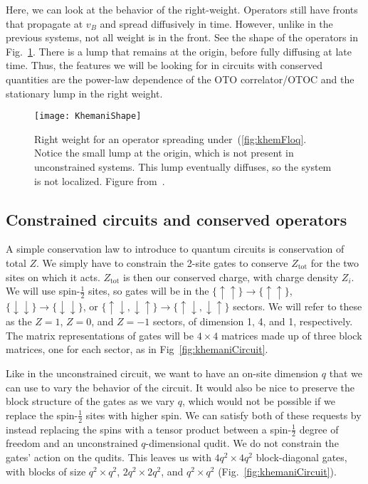 \documentclass[a4paper,11pt]{article}
\renewcommand{\th}[1]{\frac{1}{#1}}
\newcommand{\tot}{\text{tot}}
\begin{document}
Here, we can look at the behavior of the right-weight. Operators still have fronts that propagate at $v_B$ and spread diffusively in time. However, unlike in the previous systems, not all weight is in the front. See the shape of the operators in Fig.~\ref{fig:KhemaniShape}. There is a lump that remains at the origin, before fully diffusing at late time.
Thus, the features we will be looking for in circuits with conserved quantities are the power-law dependence of the OTO correlator/OTOC and the stationary lump in the right weight.
\begin{figure}
	\centering
	\texttt{[image: KhemaniShape]}
	\caption{Right weight for an operator spreading under~(\ref{fig:khemFloq}. Notice the small lump at the origin, which is not present in unconstrained systems. This lump eventually diffuses, so the system is not localized. Figure from~\cite{KhemaniOpSp}. }
	\label{fig:KhemaniShape}
\end{figure}

\subsection{Constrained circuits and conserved operators} \label{sub:ccons}

A simple conservation law to introduce to quantum circuits is conservation of total $Z$. We simply have to constrain the 2-site gates to conserve $Z_\tot$ for the two sites on which it acts. $Z_\tot$ is then our conserved charge, with charge density $Z_i$.
We will use spin-$\th{2}$ sites, so gates will be in the $\{\uparrow\uparrow\}\to\{\uparrow\uparrow\}$, $\{\downarrow\downarrow\}\to\{\downarrow\downarrow\}$, or $\{\uparrow\downarrow,\downarrow\uparrow\}\to\{\uparrow\downarrow,\downarrow\uparrow\}$ sectors. We will refer to these as the $Z=1$, $Z=0$, and $Z=-1$ sectors, of dimension 1, 4, and 1, respectively. The matrix representations of gates will be $4\times4$ matrices made up of three block matrices, one for each sector, as in Fig~\ref{fig:khemaniCircuit}.

Like in the unconstrained circuit, we want to have an on-site dimension $q$ that we can use to vary the behavior of the circuit. It would also be nice to preserve the block structure of the gates as we vary $q$, which would not be possible if we replace the spin-$\th{2}$ sites with higher spin. We can satisfy both of these requests by instead replacing the spins with a tensor product between a spin-$\th{2}$ degree of freedom and an unconstrained $q$-dimensional qudit. We do not constrain the gates' action on the qudits.
This leaves us with $4q^2\times4q^2$ block-diagonal gates, with blocks of size $q^2\times q^2$, $2q^2\times 2q^2$, and $q^2\times q^2$ (Fig.~\ref{fig:khemaniCircuit}).
\end{document}

